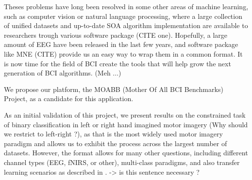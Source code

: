 Theses problems have long been resolved in some other areas of machine
learning, such as computer vision or natural language processing, where a large
collection of unified datasets and up-to-date SOA algorithm implementation are available to 
researchers trough various software package (CITE one).
Hopefully, a large amount of EEG have been released in the last few years, and software package like MNE (CITE) provide us an easy way to wrap them in a common format. It is now time for the field of BCI create the tools that will help grow the next generation of BCI algorithms. (Meh ...)

We propose our platform, the MOABB
(Mother Of All BCI Benchmarks) Project, as a candidate for this application. 

As an initial validation of this project, we present results on the constrained
task of binary classification in left or right hand imagined motor imagery (Why should we restrict to left-right ?), as
that is the most widely used motor imagery paradigm and allows us to exhibit the
process across the largest number of datasets.
However, the format allows for
many other questions, including different channel types (EEG, fNIRS, or other),
multi-class paradigms, and also transfer learning scenarios as described in
\cite{Jayaram2016}. -> is this sentence necessary ?

